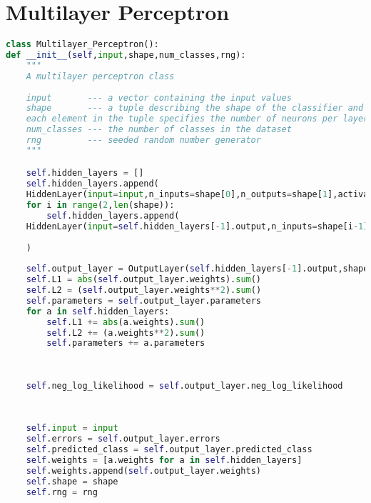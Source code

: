 \chapter{Multilayer Perceptron}
\begin{lstlisting}[language=Python, caption=Multilayer Perceptron, captionpos=b, label={list:mlp}]
class Multilayer_Perceptron():
def __init__(self,input,shape,num_classes,rng):
	"""
	A multilayer perceptron class
	
	input       --- a vector containing the input values
	shape       --- a tuple describing the shape of the classifier and its hidden layers
	each element in the tuple specifies the number of neurons per layer
	num_classes --- the number of classes in the dataset
	rng         --- seeded random number generator
	"""

	self.hidden_layers = []
	self.hidden_layers.append(
	HiddenLayer(input=input,n_inputs=shape[0],n_outputs=shape[1],activation=None,rng=rng))
	for i in range(2,len(shape)):
		self.hidden_layers.append(
	HiddenLayer(input=self.hidden_layers[-1].output,n_inputs=shape[i-1],n_outputs=shape[i],activation=None,rng=rng)
	
	)
	
	self.output_layer = OutputLayer(self.hidden_layers[-1].output,shape[-1],num_classes)
	self.L1 = abs(self.output_layer.weights).sum()
	self.L2 = (self.output_layer.weights**2).sum()
	self.parameters = self.output_layer.parameters
	for a in self.hidden_layers:
		self.L1 += abs(a.weights).sum()
		self.L2 += (a.weights**2).sum()
		self.parameters += a.parameters
	
	
	
	self.neg_log_likelihood = self.output_layer.neg_log_likelihood
	
	
	
	self.input = input
	self.errors = self.output_layer.errors
	self.predicted_class = self.output_layer.predicted_class
	self.weights = [a.weights for a in self.hidden_layers]
	self.weights.append(self.output_layer.weights)
	self.shape = shape
	self.rng = rng
\end{lstlisting}

